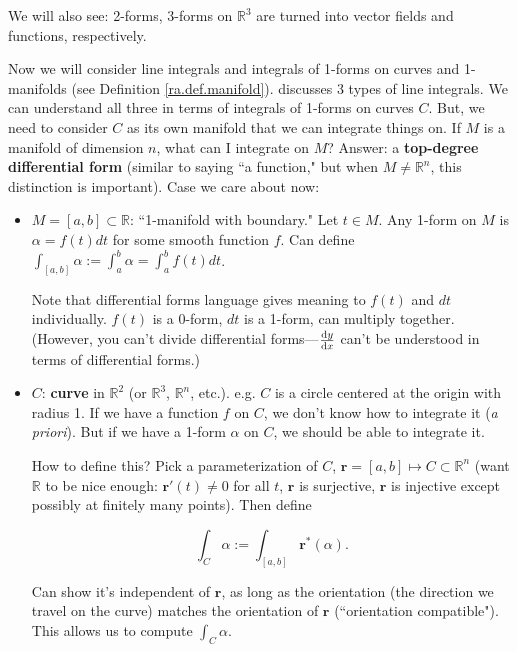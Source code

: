 We will also see: 2-forms, 3-forms on \(\mathbb{R}^3\) are turned into vector fields and functions, respectively.

Now we will consider line integrals and integrals of 1-forms on curves and 1-manifolds (see Definition \ref{ra.def.manifold}). \citet{stewart2015calculus} discusses 3 types of line integrals. We can understand all three in terms of integrals of 1-forms on curves \(C\). But, we need to consider \(C\) as its own manifold that we can integrate things on. If \(M\) is a manifold of dimension \(n\), what can I integrate on \(M\)? Answer: a \textbf{top-degree differential form} (similar to saying ``a function," but when \(M \neq \mathbb{R}^n\), this distinction is important). Case we care about now:

\begin{itemize}

\item \(M = [a,b] \subset \mathbb{R}\): ``1-manifold with boundary." Let \(t \in M\). Any 1-form on \(M\) is \(\alpha = f(t) dt\) for some smooth function \(f\). Can define \(\int_{[a,b]} \alpha := \int_a^b \alpha = \int_a^b f(t) dt\).

Note that differential forms language gives meaning to \(f(t)\) and \(dt\) individually. \(f(t)\) is a 0-form, \(dt\) is a 1-form, can multiply together. (However, you can't divide differential forms---\(\deriv{y}{x}\) can't be understood in terms of differential forms.)

\item \(C\): \textbf{curve} in \(\mathbb{R}^2\) (or \(\mathbb{R}^3\), \(\mathbb{R}^n\), etc.). e.g. \(C\) is a circle centered at the origin with radius 1. If we have a function \(f\) on \(C\), we don't know how to integrate it (\textit{a priori}). But if we have a 1-form \(\alpha\) on \(C\), we should be able to integrate it.  

How to define this? Pick a parameterization of \(C\), \(\boldsymbol{r} = [a,b] \mapsto C \subset \mathbb{R}^n\) (want \(\mathbb{R}\) to be nice enough: \(\boldsymbol{r}'(t) \neq 0 \) for all \(t\), \(\boldsymbol{r}\) is surjective, \(\boldsymbol{r}\) is injective except possibly at finitely many points). Then define 

\begin{equation}\label{ra.def.diff.form.int}
\int_C \alpha := \int_{[a,b]} \boldsymbol{r}^*(\alpha).
\end{equation}

 Can show it's independent of \(\boldsymbol{r}\), as long as the orientation (the direction we travel on the curve) matches the orientation of \(\boldsymbol{r}\) (``orientation compatible"). This allows us to compute \(\int_C \alpha \).

\end{itemize}

